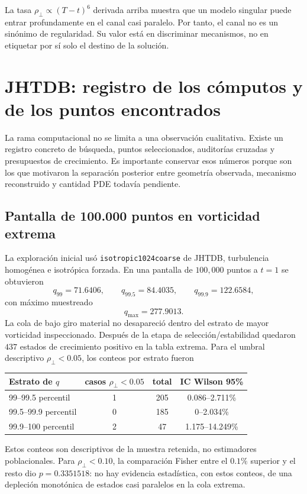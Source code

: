 \documentclass[11pt]{article}
\newcommand{\rhoT}{\rho_{\perp}}
\begin{document}
La tasa $\rhoT\propto(T-t)^6$ derivada arriba muestra que un modelo singular puede entrar profundamente en el canal casi paralelo. Por tanto, el canal no es un sinónimo de regularidad. Su valor está en discriminar mecanismos, no en etiquetar por sí solo el destino de la solución.

\section{JHTDB: registro de los cómputos y de los puntos encontrados}

La rama computacional no se limita a una observación cualitativa. Existe un registro concreto de búsqueda, puntos seleccionados, auditorías cruzadas y presupuestos de crecimiento. Es importante conservar esos números porque son los que motivaron la separación posterior entre geometría observada, mecanismo reconstruido y cantidad PDE todavía pendiente.

\subsection{Pantalla de 100.000 puntos en vorticidad extrema}

La exploración inicial usó \texttt{isotropic1024coarse} de JHTDB, turbulencia homogénea e isotrópica forzada. En una pantalla de $100{,}000$ puntos a $t=1$ se obtuvieron
\[
q_{99}=71.6406,\qquad
q_{99.5}=84.4035,\qquad
q_{99.9}=122.6584,
\]
con máximo muestreado
\[
q_{\max}=277.9013.
\]
La cola de bajo giro material no desapareció dentro del estrato de mayor vorticidad inspeccionado. Después de la etapa de selección/estabilidad quedaron $437$ estados de crecimiento positivo en la tabla extrema. Para el umbral descriptivo $\rhoT<0.05$, los conteos por estrato fueron

\begin{center}
\begin{tabular}{lccc}
\toprule
Estrato de $q$ & casos $\rhoT<0.05$ & total & IC Wilson 95\% \\
\midrule
99--99.5 percentil & 1 & 205 & 0.086--2.711\% \\
99.5--99.9 percentil & 0 & 185 & 0--2.034\% \\
99.9--100 percentil & 2 & 47 & 1.175--14.249\% \\
\bottomrule
\end{tabular}
\end{center}

Estos conteos son descriptivos de la muestra retenida, no estimadores poblacionales. Para $\rhoT<0.10$, la comparación Fisher entre el $0.1\%$ superior y el resto dio $p=0.3351518$: no hay evidencia estadística, con estos conteos, de una depleción monotónica de estados casi paralelos en la cola extrema.
\end{document}
